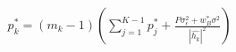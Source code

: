 \documentclass[preview]{standalone}
\begin{document}
\begin{align*}
p_k^\ast = \left(m_k-1\right) \left(\sum_{j=1}^{K-1} {p_j^\ast} + \frac{P \sigma_{\epsilon}^2 + w_B^\ast \sigma^2}{\left|\hat{h_k}\right|^2}\right)
\end{align*}
\end{document}
